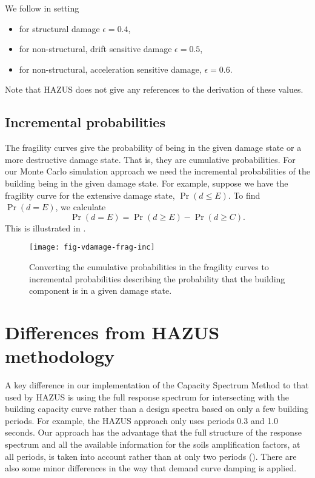 We follow \cite{dr_FEMA99b} in setting
\begin{itemize}
\item for structural damage $\epsilon=0.4$, \item for
non-structural, drift sensitive damage $\epsilon=0.5$, \item for
non-structural, acceleration sensitive damage,
  $\epsilon=0.6$.
\end{itemize}
Note that HAZUS does not give any references to the derivation of
these values.


\subsection{Incremental probabilities}

The fragility curves give the probability
of being in the given damage state or a more destructive damage state. That is, they are
cumulative probabilities. For our Monte Carlo simulation approach
we need the incremental probabilities of the building being in the
given damage state. For example,  suppose we have the fragility
curve for the extensive damage state,
$\Pr(d \le E)$. To find $\Pr(d=E)$, we calculate
$$
\Pr(d=E) = \Pr(d \ge E) - \Pr(d \ge C).
$$
This is illustrated in .

\begin{figure}[htp]
\centering
{}
\texttt{[image: fig-vdamage-frag-inc]}
\caption{Converting the cumulative
  probabilities in the fragility curves to incremental probabilities
  describing the probability that the building component is in a given damage state.}
\label{fig:vdamage-frag-inc}
\end{figure}


\section{Differences from HAZUS methodology}


A key difference in our implementation of the Capacity Spectrum
Method to that used by HAZUS is
using the full response spectrum for intersecting with the
building capacity curve rather than a design
spectra based on only a few building periods. For example, the
HAZUS approach only uses periods 0.3 and 1.0 seconds. Our approach
has the advantage that the full structure of the response spectrum
and all the available information for the soils amplification
factors, at all periods, is taken into account rather than at only
two periods (). There are also some
minor differences in the way that demand curve damping is applied.

